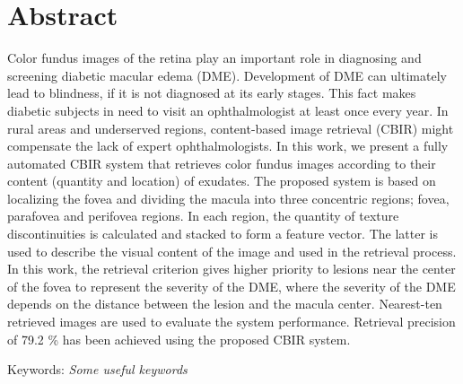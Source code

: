 \begingroup
\let\clearpage\relax
\let\cleardoublepage\relax
\let\cleardoublepage\relax

\chapter*{Abstract}
Color fundus images of the retina play an important role in diagnosing and screening diabetic macular edema (DME). Development of DME can ultimately lead to blindness, if it is not diagnosed at its early stages. This fact makes diabetic subjects in need to visit an ophthalmologist at least once every year. In rural areas and underserved regions, content-based image retrieval (CBIR) might compensate the lack of expert ophthalmologists. In this work, we present a fully automated CBIR system that retrieves color fundus images according to their content (quantity and location) of exudates. The proposed system is based on localizing the fovea and dividing the macula into three concentric regions; fovea, parafovea and perifovea regions. In each region, the quantity of texture discontinuities is calculated and stacked to form a feature vector. The latter is used to describe the visual content of the image and used in the retrieval process. In this work, the retrieval criterion gives higher priority to lesions near the center of the fovea to represent the severity of the DME, where the severity of the DME depends on the distance between the lesion and the macula center. Nearest-ten retrieved images are used to evaluate the system performance. Retrieval precision of 79.2 \% has been achieved using the proposed CBIR system.

\vspace{1cm}
{\hspace{-0.6cm}Keywords: \textit{Some useful keywords}}   

\vfill

\endgroup			

\vfill